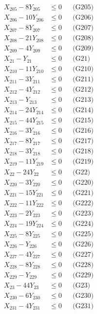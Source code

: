 \documentclass[a4paper,10pt]{article}
\begin{document}
{\begin{align}
X_{205} - 8Y_{205} &\leq 0 && \text{(G205)} \\
\allowbreak
X_{206} - 10Y_{206} &\leq 0 && \text{(G206)} \\
X_{207} - 8Y_{207} &\leq 0 && \text{(G207)} \\
X_{208} - 21Y_{208} &\leq 0 && \text{(G208)} \\
X_{209} - 4Y_{209} &\leq 0 && \text{(G209)} \\
X_{21} - Y_{21} &\leq 0 && \text{(G21)} \\
X_{210} - 11Y_{210} &\leq 0 && \text{(G210)} \\
X_{211} - 3Y_{211} &\leq 0 && \text{(G211)} \\
X_{212} - 4Y_{212} &\leq 0 && \text{(G212)} \\
X_{213} - Y_{213} &\leq 0 && \text{(G213)} \\
X_{214} - 24Y_{214} &\leq 0 && \text{(G214)} \\
X_{215} - 44Y_{215} &\leq 0 && \text{(G215)} \\
X_{216} - 3Y_{216} &\leq 0 && \text{(G216)} \\
X_{217} - 8Y_{217} &\leq 0 && \text{(G217)} \\
X_{218} - 3Y_{218} &\leq 0 && \text{(G218)} \\
X_{219} - 11Y_{219} &\leq 0 && \text{(G219)} \\
X_{22} - 24Y_{22} &\leq 0 && \text{(G22)} \\
X_{220} - 3Y_{220} &\leq 0 && \text{(G220)} \\
X_{221} - 15Y_{221} &\leq 0 && \text{(G221)} \\
X_{222} - 11Y_{222} &\leq 0 && \text{(G222)} \\
X_{223} - 2Y_{223} &\leq 0 && \text{(G223)} \\
\allowbreak
X_{224} - 19Y_{224} &\leq 0 && \text{(G224)} \\
X_{225} - 8Y_{225} &\leq 0 && \text{(G225)} \\
X_{226} - Y_{226} &\leq 0 && \text{(G226)} \\
X_{227} - 4Y_{227} &\leq 0 && \text{(G227)} \\
X_{228} - 8Y_{228} &\leq 0 && \text{(G228)} \\
X_{229} - Y_{229} &\leq 0 && \text{(G229)} \\
X_{23} - 44Y_{23} &\leq 0 && \text{(G23)} \\
X_{230} - 6Y_{230} &\leq 0 && \text{(G230)} \\
X_{231} - 4Y_{231} &\leq 0 && \text{(G231)} \\

\end{align}}
\end{document}
